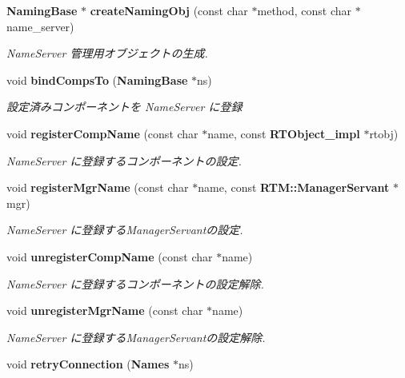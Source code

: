 \begin{DoxyCompactItemize}
\item 
{\bf NamingBase} $\ast$ {\bf createNamingObj} (const char $\ast$method, const char $\ast$name\_\-server)
\begin{DoxyCompactList}\small\item\em NameServer 管理用オブジェクトの生成. \item\end{DoxyCompactList}\item 
void {\bf bindCompsTo} ({\bf NamingBase} $\ast$ns)
\begin{DoxyCompactList}\small\item\em 設定済みコンポーネントを NameServer に登録 \item\end{DoxyCompactList}\item 
void {\bf registerCompName} (const char $\ast$name, const {\bf RTObject\_\-impl} $\ast$rtobj)
\begin{DoxyCompactList}\small\item\em NameServer に登録するコンポーネントの設定. \item\end{DoxyCompactList}\item 
void {\bf registerMgrName} (const char $\ast$name, const {\bf RTM::ManagerServant} $\ast$mgr)
\begin{DoxyCompactList}\small\item\em NameServer に登録するManagerServantの設定. \item\end{DoxyCompactList}\item 
void {\bf unregisterCompName} (const char $\ast$name)
\begin{DoxyCompactList}\small\item\em NameServer に登録するコンポーネントの設定解除. \item\end{DoxyCompactList}\item 
void {\bf unregisterMgrName} (const char $\ast$name)
\begin{DoxyCompactList}\small\item\em NameServer に登録するManagerServantの設定解除. \item\end{DoxyCompactList}\item 
void {\bf retryConnection} ({\bf Names} $\ast$ns)
\end{DoxyCompactItemize}
